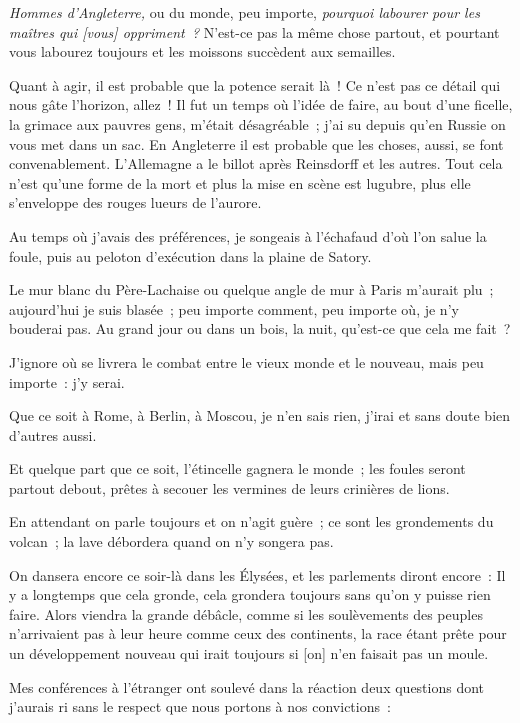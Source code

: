 \documentclass[french,twoside]{book} %
\newcommand\corr[1]{#1}
\newcommand{\bibl}[1]{{\RaggedLeft{#1}\par\bigskip}}
\newcommand\chaptercont{} %
\begin{document}
\bibl{S{\scshape helley}.}

\chaptercont
\noindent \emph{Hommes d’Angleterre,} ou du monde, peu importe, \emph{pourquoi labourer pour les maîtres qui [{\corr vous}] oppriment ?} N’est-ce pas la même chose partout, et pourtant vous labourez toujours et les moissons succèdent aux semailles.\par
Quant à agir, il est probable que la potence serait là ! Ce n’est pas ce détail qui nous gâte l’horizon, allez ! Il fut un temps où l’idée de faire, au bout d’une ficelle, la grimace aux pauvres gens, m’était désagréable ; j’ai su depuis qu’en Russie on vous met dans un sac. En Angleterre il est probable que les choses, aussi, se font convenablement. L’Allemagne a le billot après Reinsdorff et les autres. Tout cela n’est qu’une forme de la mort et plus la mise en scène est lugubre, plus elle s’enveloppe des rouges lueurs de l’aurore.\par
 Au temps où j’avais des préférences, je songeais à l’échafaud d’où l’on salue la foule, puis au peloton d’exécution dans la plaine de Satory.\par
Le mur blanc du Père-Lachaise ou quelque angle de mur à Paris m’aurait plu ; aujourd’hui je suis blasée ; peu importe comment, peu importe où, je n’y bouderai pas. Au grand jour ou dans un bois, la nuit, qu’est-ce que cela me fait ?\par
J’ignore où se livrera le combat entre le vieux monde et le nouveau, mais peu importe : j’y serai.\par
Que ce soit à Rome, à Berlin, à Moscou, je n’en sais rien, j’irai et sans doute bien d’autres aussi.\par
Et quelque part que ce soit, l’étincelle gagnera le monde ; les foules seront partout debout, prêtes à secouer les vermines de leurs crinières de lions.\par
En attendant on parle toujours et on n’agit guère ; ce sont les grondements du volcan ; la lave débordera quand on n’y songera pas.\par
On dansera encore ce soir-là dans les Élysées, et les parlements diront encore : Il y a longtemps que cela gronde, cela grondera toujours sans qu’on y puisse rien faire. Alors viendra la grande débâcle, comme si les soulèvements des peuples n’arrivaient pas à leur heure comme ceux des  continents, la race étant prête pour un développement nouveau qui irait toujours si [{\corr on}] n’en faisait pas un moule.\par
Mes conférences à l’étranger ont soulevé dans la réaction deux questions dont j’aurais ri sans le respect que nous portons à nos convictions :\par
\end{document}
